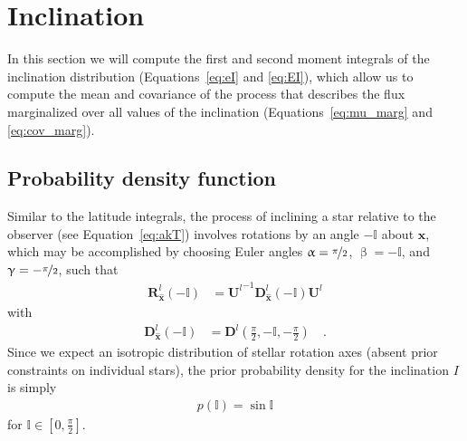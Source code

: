 \documentclass[modern]{aastex62}
\begin{document}
\section{Inclination}
\label{sec:inc}

In this section we will compute the first and second moment integrals of the
inclination distribution (Equations~\ref{eq:eI} and \ref{eq:EI}),
which allow us to compute the mean and covariance of the process
that describes the flux marginalized over all values of the inclination
(Equations~\ref{eq:mu_marg} and \ref{eq:cov_marg}).

\subsection{Probability density function}
%
Similar to the latitude integrals, the process of inclining a star relative to the
observer (see Equation~\ref{eq:akT}) involves
rotations by an angle $-\mathbb{I}$ about $\hat{\mathbf{x}}$, which
may be accomplished by choosing
Euler angles $\upalpha = \nicefrac{\pi}{2}$, $\upbeta = -\mathbb{I}$, and
$\upgamma = -\nicefrac{\pi}{2}$, such that
%
\begin{align}
    \mathbf{R}^l_{\hat{\mathbf{x}}}\left(-\mathbb{I}\right)
     & =
    {\mathbf{U}^l}^{-1} \mathbf{D}^l_{\hat{\mathbf{x}}}\left(-\mathbb{I}\right) \mathbf{U}^l
\end{align}
%
with
\begin{align}
    \mathbf{D}^l_{\hat{\mathbf{x}}}\left(-\mathbb{I}\right)
     & =
    \mathbf{D}^l\left(\frac{\pi}{2}, -\mathbb{I}, -\frac{\pi}{2}\right)
    \quad.
\end{align}
%
Since we expect an isotropic distribution of stellar rotation axes (absent
prior constraints on individual stars), the prior probability density for
the inclination $I$ is simply
%
\begin{align}
    p(\mathbb{I}) = \sin \mathbb{I}
\end{align}
%
for $\mathbb{I} \in [0, \frac{\pi}{2}]$.
\end{document}
